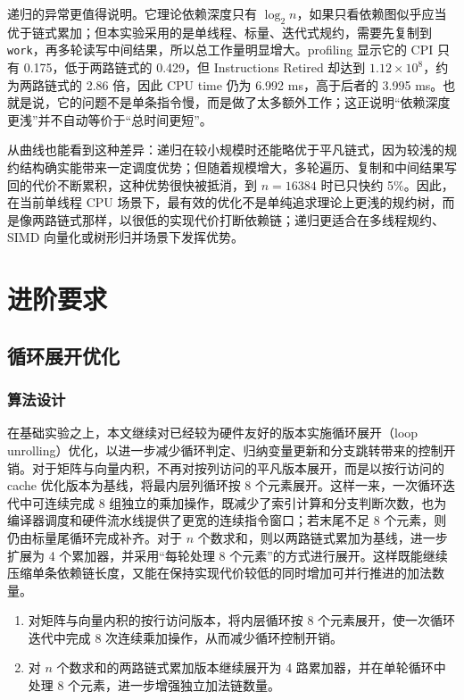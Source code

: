 ﻿\documentclass[UTF8,a4paper,12pt]{ctexart}
\begin{document}
递归的异常更值得说明。它理论依赖深度只有 \(\log_2 n\)，如果只看依赖图似乎应当优于链式累加；但本实验采用的是单线程、标量、迭代式规约，需要先复制到 \texttt{work}，再多轮读写中间结果，所以总工作量明显增大。profiling 显示它的 CPI 只有 0.175，低于两路链式的 0.429，但 Instructions Retired 却达到 \(1.12\times 10^8\)，约为两路链式的 2.86 倍，因此 CPU time 仍为 6.992 ms，高于后者的 3.995 ms。也就是说，它的问题不是单条指令慢，而是做了太多额外工作；这正说明“依赖深度更浅”并不自动等价于“总时间更短”。

从曲线也能看到这种差异：递归在较小规模时还能略优于平凡链式，因为较浅的规约结构确实能带来一定调度优势；但随着规模增大，多轮遍历、复制和中间结果写回的代价不断累积，这种优势很快被抵消，到 \(n=16384\) 时已只快约 5\%。因此，在当前单线程 CPU 场景下，最有效的优化不是单纯追求理论上更浅的规约树，而是像两路链式那样，以很低的实现代价打断依赖链；递归更适合在多线程规约、SIMD 向量化或树形归并场景下发挥优势。

\section{进阶要求}

\subsection{循环展开优化}

\subsubsection{算法设计}
在基础实验之上，本文继续对已经较为硬件友好的版本实施循环展开（loop unrolling）优化，以进一步减少循环判定、归纳变量更新和分支跳转带来的控制开销。对于矩阵与向量内积，不再对按列访问的平凡版本展开，而是以按行访问的 cache 优化版本为基线，将最内层列循环按 8 个元素展开。这样一来，一次循环迭代中可连续完成 8 组独立的乘加操作，既减少了索引计算和分支判断次数，也为编译器调度和硬件流水线提供了更宽的连续指令窗口；若末尾不足 8 个元素，则仍由标量尾循环完成补齐。对于 \(n\) 个数求和，则以两路链式累加为基线，进一步扩展为 4 个累加器，并采用“每轮处理 8 个元素”的方式进行展开。这样既能继续压缩单条依赖链长度，又能在保持实现代价较低的同时增加可并行推进的加法数量。
\begin{enumerate}[label=\arabic*.]
    \item 对矩阵与向量内积的按行访问版本，将内层循环按 8 个元素展开，使一次循环迭代中完成 8 次连续乘加操作，从而减少循环控制开销。
    \item 对 \(n\) 个数求和的两路链式累加版本继续展开为 4 路累加器，并在单轮循环中处理 8 个元素，进一步增强独立加法链数量。
\end{enumerate}
\end{document}
